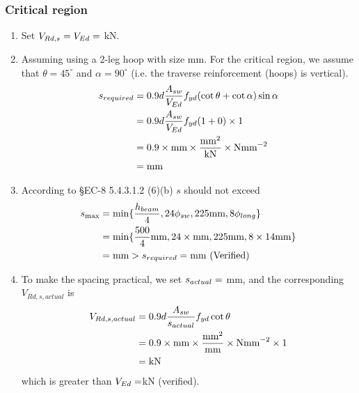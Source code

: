 \subsubsection{Critical region}
\begin{enumerate}
\item Set $V_{Rd,s} = V_{Ed} = \g{VEd}$ kN.
\item Assuming using a 2-leg hoop with size  mm. For the critical
  region, we assume that $\theta = 45 ^{\circ}$ and $\alpha = 90 ^{\circ}$ (i.e.
  the traverse reinforcement (hoops) is vertical).
  \begin{align*}
    s_{required} &= 0.9d \frac{A_{sw}}{V_{Ed}} f_{yd}
                   (\cot \theta + \cot \alpha)\sin \alpha \\
                 &= 0.9d \frac{A_{sw}}{V_{Ed}} f_{yd} (1 + 0) \times 1\\
                 &= 0.9 \times \g{d} \mbox{mm}
                   \times
                   \frac{\g{Asw}\mbox{mm}^{2}}{\g{VEd} \mbox{kN}}
                   \times \g{fyd} \mbox{Nmm}^{-2} \\
                 &= \g{sreq} \mbox{mm}
  \end{align*}
\item According to \S EC-8 5.4.3.1.2 (6)(b) $s$ should not exceed
  \begin{align*}
    s_{\max} &= \min \{ \frac{h_{beam}}{4}, 24\phi_{sw},
               225\mbox{mm}, 8\phi_{long} \} \\
             &= \min \{ \frac{500}{4} \mbox{mm}, 24 \times \g{dh} \mbox{mm},
               225\mbox{mm}, 8 \times 14 \mbox{mm}\} \\
             &= \g{smax}
               \mbox{mm} > s_{required} = \g{sreq} \mbox{mm (Verified)} \\
  \end{align*}
\item To make the spacing practical, we set $s_{actual} = \g{sact}$ mm, and
  the corresponding $V_{Rd, s, actual} $ is
\begin{align*}
  V_{Rd, s, actual}&= 0.9d \frac{A_{sw}}{s_{actual}}f_{yd}\cot  \theta \\
  &= 0.9 \times \g{d} \mbox{mm}
  \times \frac{\g{Asw} \mbox{mm}^{2}}{\g{sact} \mbox{mm}}
  \times \g{fyd} \mbox{Nmm}^{-2} \times 1 \\
  &= \g{VRdsAct} \mbox{kN}
\end{align*}
  which is greater than $V_{Ed} = \g{VEd} $kN (verified).
\end{enumerate}

